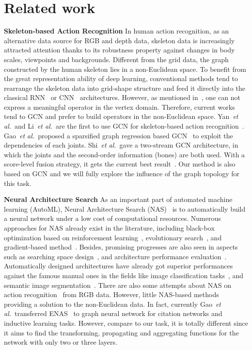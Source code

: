 \documentclass[letterpaper]{article} \usepackage{aaai19}  \usepackage{times}  \usepackage{helvet} \usepackage{courier}  \usepackage[hyphens]{url}  \usepackage{graphicx} \urlstyle{rm} \def\UrlFont{\rm}  \usepackage{graphicx}  \frenchspacing  \setlength{\pdfpagewidth}{8.5in}  \setlength{\pdfpageheight}{11in}
\def\etal{\emph{et al.}}
\begin{document}
\section{Related work}

\textbf{Skeleton-based Action Recognition}
In human action recognition, as an alternative data source for RGB and depth data, skeleton data is increasingly attracted attention thanks to its robustness property against changes in body scales, viewpoints and backgrounds. Different from the grid data, the graph constructed by the human skeleton lies in a non-Euclidean space. To benefit from the great representation ability of deep learning, conventional methods tend to rearrange the skeleton data into grid-shape structure and feed it directly into the classical RNN~\cite{shahroudy2016ntu,song2017end,zhang2017view} or CNN~\cite{kim2017interpretable,liu2017enhanced} architectures. However, as mentioned in~\cite{monti2017geometric}, one can not express a meaningful operator in the vertex domain. Therefore, current works tend to GCN and prefer to build operators in the non-Euclidean space. Yan~\etal ~and Li~\etal~are the first to use GCN for skeleton-based action recognition~\cite{yan2018stgan,li2018spatio}. Gao~\etal~proposed a sparsified graph regression based GCN~\cite{gao2019optimized} to exploit the dependencies of each joints. Shi~\etal~gave a two-stream GCN architecture, in which the joints and the second-order information (bones) are both used. With a score-level fusion strategy, it gets the current best result~\cite{shi2019two}. Our method is also based on GCN and we will fully explore the influence of the graph topology for this task.

\noindent \textbf{Neural Architecture Search}
As an important part of automated machine learning (AutoML), Neural Architecture Search (NAS)~\cite{zoph2016neural} is to automatically build a neural network under a low cost of computational resources. Numerous approaches for NAS already exist in the literature, including black-box optimization based on reinforcement learning~\cite{zoph2016neural}, evolutionary search~\cite{real2018regularized}, and gradient-based method~\cite{liu2018darts}. Besides, promising progresses are also seen in aspects such as searching space design~\cite{liu2018darts}, and architecture performance evaluation~\cite{saxena2016convolutional,real2018regularized}. Automatically designed architectures have already got superior performances against the famous manual ones in the fields like image classification tasks~\cite{zoph2018learning}, and semantic image segmentation~\cite{liu2019auto}. There are also some attempts about NAS on action recognition~\cite{peng2019video} from RGB data. However, little NAS-based methods providing a solution to the non-Euclidean data. In fact, currently Gao~\etal~transferred ENAS~\cite{pham2018efficient} to graph neural network for citation networks and inductive learning tasks. However, compare to our task, it is totally different since it aims to find the transforming, propagating and aggregating functions for the network with only two or three layers.    
\end{document}
